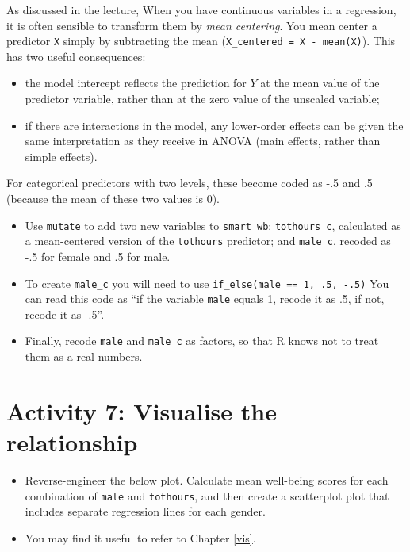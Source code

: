 \documentclass[]{book}
\providecommand{\tightlist}{%
  \setlength{\itemsep}{0pt}\setlength{\parskip}{0pt}}
\begin{document}
As discussed in the lecture, When you have continuous variables in a regression, it is often sensible to transform them by \emph{mean centering}. You mean center a predictor \texttt{X} simply by subtracting the mean (\texttt{X\_centered\ =\ X\ -\ mean(X)}). This has two useful consequences:

\begin{itemize}
\item
  the model intercept reflects the prediction for \(Y\) at the mean value of the predictor variable, rather than at the zero value of the unscaled variable;
\item
  if there are interactions in the model, any lower-order effects can be given the same interpretation as they receive in ANOVA (main effects, rather than simple effects).
\end{itemize}

For categorical predictors with two levels, these become coded as -.5 and .5 (because the mean of these two values is 0).

\begin{itemize}
\tightlist
\item
  Use \texttt{mutate} to add two new variables to \texttt{smart\_wb}: \texttt{tothours\_c}, calculated as a mean-centered version of the \texttt{tothours} predictor; and \texttt{male\_c}, recoded as -.5 for female and .5 for male.
\item
  To create \texttt{male\_c} you will need to use \texttt{if\_else(male\ ==\ 1,\ .5,\ -.5)} You can read this code as ``if the variable \texttt{male} equals 1, recode it as .5, if not, recode it as -.5''.
\item
  Finally, recode \texttt{male} and \texttt{male\_c} as factors, so that R knows not to treat them as a real numbers.
\end{itemize}

\hypertarget{activity-7-visualise-the-relationship}{%
\section{Activity 7: Visualise the relationship}\label{activity-7-visualise-the-relationship}}

\begin{itemize}
\tightlist
\item
  Reverse-engineer the below plot. Calculate mean well-being scores for each combination of \texttt{male} and \texttt{tothours}, and then create a scatterplot plot that includes separate regression lines for each gender.
\item
  You may find it useful to refer to Chapter \ref{vis}.
\end{itemize}
\end{document}
